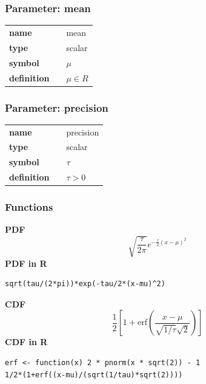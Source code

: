 \subsubsection*{Parameter: mean}

\noindent\begin{tabular}{p{2cm}cl}
\textbf{name} & & mean \\
\textbf{type} & & scalar \\
\textbf{symbol} & & $\mu$  \\
\textbf{definition} & & $\mu \in  R$
\end{tabular}
\subsubsection*{Parameter: precision}

\noindent\begin{tabular}{p{2cm}cl}
\textbf{name} & & precision \\
\textbf{type} & & scalar \\
\textbf{symbol} & & $\tau$  \\
\textbf{definition} & & $\tau>0$
\end{tabular}
\subsubsection*{Functions}

\smallskip \noindent \hspace{.2cm} \textbf{PDF} 
\begin{equation*}\sqrt{\frac{\tau}{2 \pi}} e^{-\frac{\tau}{2}(x-\mu)^2}\end{equation*}
\smallskip \noindent \hspace{.2cm} \textbf{PDF in R}  
\begin{verbatim}sqrt(tau/(2*pi))*exp(-tau/2*(x-mu)^2)\end{verbatim}
\smallskip \noindent \hspace{.2cm} \textbf{CDF} 
\begin{equation*}\frac12\left[1 + \text{erf}\left( \frac{x-\mu}{\sqrt{1/\tau}\sqrt{2}}\right)\right]\end{equation*}
\smallskip \noindent \hspace{.2cm} \textbf{CDF in R} 
\begin{verbatim}
erf <- function(x) 2 * pnorm(x * sqrt(2)) - 1
1/2*(1+erf((x-mu)/(sqrt(1/tau)*sqrt(2)))) 
\end{verbatim}


